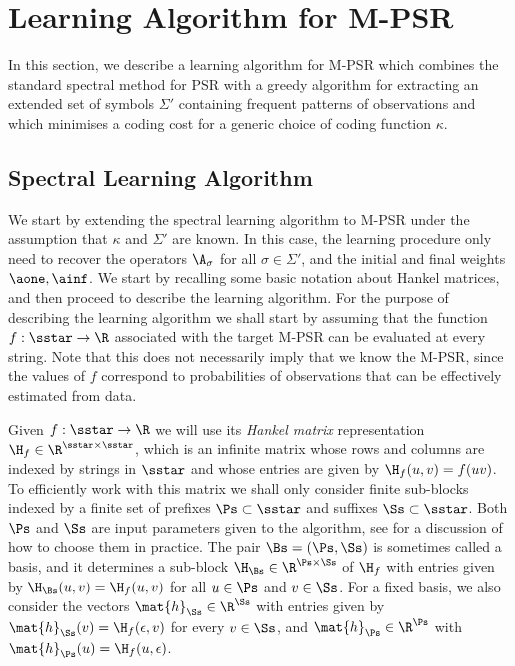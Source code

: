 \section{Learning Algorithm for M-PSR}

In this section, we describe a learning algorithm for M-PSR which combines the standard spectral method for PSR \cite{bootspsr} with a greedy algorithm for extracting an extended set of symbols $\Sigma'$ containing frequent patterns of observations and which minimises a coding cost for a generic choice of coding function $\kappa$.

\subsection{Spectral Learning Algorithm}

We start by extending the spectral learning algorithm to M-PSR under the assumption that $\kappa$ and $\Sigma'$ are known. In this case, the learning procedure only need to recover the operators $\A_\sigma$ for all $\sigma \in \Sigma'$, and the initial and final weights $\aone, \ainf$. We start by recalling some basic notation about Hankel matrices, and then proceed to describe the learning algorithm. For the purpose of describing the learning algorithm we shall start by assuming that the function $f : \sstar \to \R$ associated with the target M-PSR can be evaluated at every string. Note that this does not necessarily imply that we know the M-PSR, since the values of $f$ correspond to probabilities of observations that can be effectively estimated from data. 

Given $f : \sstar \to \R$ we will use its \emph{Hankel matrix} representation $\H_f \in \R^{\sstar \times \sstar}$, which is an infinite matrix whose rows and columns are indexed by strings in $\sstar$ and whose entries are given by $\H_f(u,v) = f(u v)$. To efficiently work with this matrix we shall only consider finite sub-blocks indexed by a finite set of prefixes $\Ps \subset \sstar$ and suffixes $\Ss \subset \sstar$. Both $\Ps$ and $\Ss$ are input parameters given to the algorithm, see \cite{BLA} for a discussion of how to choose them in practice. The pair $\Bs = (\Ps,\Ss)$ is sometimes called a basis, and it determines a sub-block $\H_\Bs \in \R^{\Ps \times \Ss}$ of $\H_f$ with entries given by $\H_\Bs(u,v) = \H_f(u,v)$ for all $u \in \Ps$ and $v \in \Ss$. For a fixed basis, we also consider the vectors $\mat{h}_{\Ss} \in \R^{\Ss}$ with entries given by $\mat{h}_{\Ss}(v) = \H_f(\epsilon,v)$ for every $v \in \Ss$, and $\mat{h}_{\Ps} \in \R^{\Ps}$ with $\mat{h}_{\Ps}(u) = \H_f(u,\epsilon)$.

